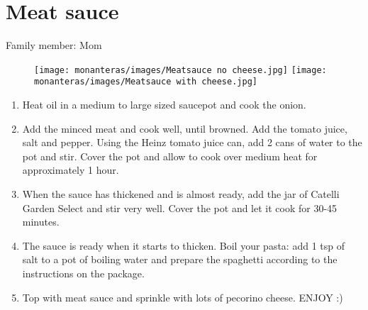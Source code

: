 \chapter{Meat sauce}
\label{ch:meatsauce}

Family member: Mom


\begin{figure}
    \texttt{[image: monanteras/images/Meatsauce no cheese.jpg]}
    \texttt{[image: monanteras/images/Meatsauce with cheese.jpg]}
\end{figure}


\begin{enumerate}
    \item Heat oil in a medium to large sized saucepot and cook the onion.
    \item Add the minced meat and cook well, until browned. Add the tomato juice, salt and pepper. Using the Heinz tomato juice can, add 2 cans of water to the pot and stir. Cover the pot and allow to cook over medium heat for approximately 1 hour.
    \item When the sauce has thickened and is almost ready, add the jar of Catelli Garden Select and stir very well. Cover the pot and let it cook for 30-45 minutes.
    \item The sauce is ready when it starts to thicken. Boil your pasta: add 1 tsp of salt to a pot of boiling water and prepare the spaghetti according to the instructions on the package.
    \item Top with meat sauce and sprinkle with lots of pecorino cheese. ENJOY :)
\end{enumerate}